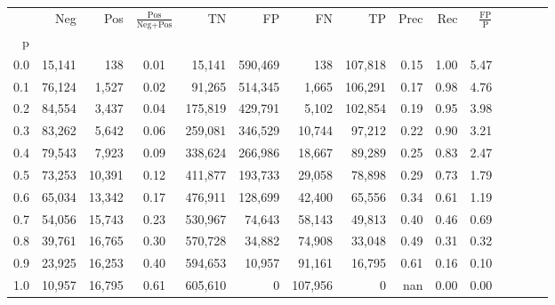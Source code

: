 \begin{tabular}{rrrcrrrrrrrrrrr}
\toprule
{} &     Neg &     Pos & $\frac{\text{Pos}}{\text{Neg}+\text{Pos}}$ &       TN &       FP &       FN &       TP &  Prec &   Rec & $\frac{\text{FP}}{\text{P}}$ \\
p   &         &         &                                            &          &          &          &          &       &       &                              \\
\midrule
0.0 &  15,141 &     138 &                                       0.01 &   15,141 &  590,469 &      138 &  107,818 &  0.15 &  1.00 &                         5.47 \\
0.1 &  76,124 &   1,527 &                                       0.02 &   91,265 &  514,345 &    1,665 &  106,291 &  0.17 &  0.98 &                         4.76 \\
0.2 &  84,554 &   3,437 &                                       0.04 &  175,819 &  429,791 &    5,102 &  102,854 &  0.19 &  0.95 &                         3.98 \\
0.3 &  83,262 &   5,642 &                                       0.06 &  259,081 &  346,529 &   10,744 &   97,212 &  0.22 &  0.90 &                         3.21 \\
0.4 &  79,543 &   7,923 &                                       0.09 &  338,624 &  266,986 &   18,667 &   89,289 &  0.25 &  0.83 &                         2.47 \\
0.5 &  73,253 &  10,391 &                                       0.12 &  411,877 &  193,733 &   29,058 &   78,898 &  0.29 &  0.73 &                         1.79 \\
0.6 &  65,034 &  13,342 &                                       0.17 &  476,911 &  128,699 &   42,400 &   65,556 &  0.34 &  0.61 &                         1.19 \\
0.7 &  54,056 &  15,743 &                                       0.23 &  530,967 &   74,643 &   58,143 &   49,813 &  0.40 &  0.46 &                         0.69 \\
0.8 &  39,761 &  16,765 &                                       0.30 &  570,728 &   34,882 &   74,908 &   33,048 &  0.49 &  0.31 &                         0.32 \\
0.9 &  23,925 &  16,253 &                                       0.40 &  594,653 &   10,957 &   91,161 &   16,795 &  0.61 &  0.16 &                         0.10 \\
1.0 &  10,957 &  16,795 &                                       0.61 &  605,610 &        0 &  107,956 &        0 &   nan &  0.00 &                         0.00 \\
\bottomrule
\end{tabular}
